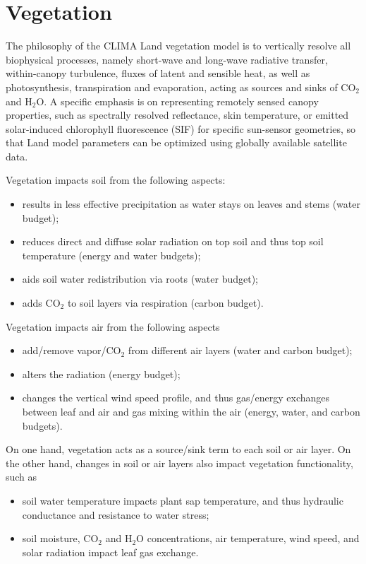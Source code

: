 \documentclass[twoside,10pt]{report}
\begin{document}
\chapter{Vegetation}



The philosophy of the CLIMA Land vegetation model is to vertically resolve all biophysical processes, namely short-wave and long-wave radiative transfer, within-canopy turbulence, fluxes of latent and sensible heat, as well as photosynthesis, transpiration and evaporation, acting as sources and sinks of CO$_2$ and H$_2$O. A specific emphasis is on representing remotely sensed canopy properties, such as spectrally resolved reflectance, skin temperature, or emitted solar-induced chlorophyll fluorescence (SIF) for specific sun-sensor geometries, so that Land model parameters can be optimized using globally available satellite data.

\par Vegetation impacts soil from the following aspects:
\begin{itemize}[noitemsep,topsep=0pt]
    \item results in less effective precipitation as water stays on leaves and stems (water budget);
    \item reduces direct and diffuse solar radiation on top soil and thus top soil temperature (energy and water budgets);
    \item aids soil water redistribution via roots (water budget);
    \item adds CO$_2$ to soil layers via respiration (carbon budget).
\end{itemize}

\par \noindent Vegetation impacts air from the following aspects
\begin{itemize}[noitemsep,topsep=0pt]
    \item add/remove vapor/CO$_2$ from different air layers (water and carbon budget);
    \item alters the radiation (energy budget);
    \item changes the vertical wind speed profile, and thus gas/energy exchanges between leaf and air and gas mixing within the air (energy, water, and carbon budgets).
\end{itemize}

\par On one hand, vegetation acts as a source/sink term to each soil or air layer. On the other hand, changes in soil or air layers also impact vegetation functionality, such as
\begin{itemize}[noitemsep,topsep=0pt]
    \item soil water temperature impacts plant sap temperature, and thus hydraulic conductance and resistance to water stress;
    \item soil moisture, CO$_2$ and H$_2$O concentrations, air temperature, wind speed, and solar radiation impact leaf gas exchange.
\end{itemize}
\end{document}
